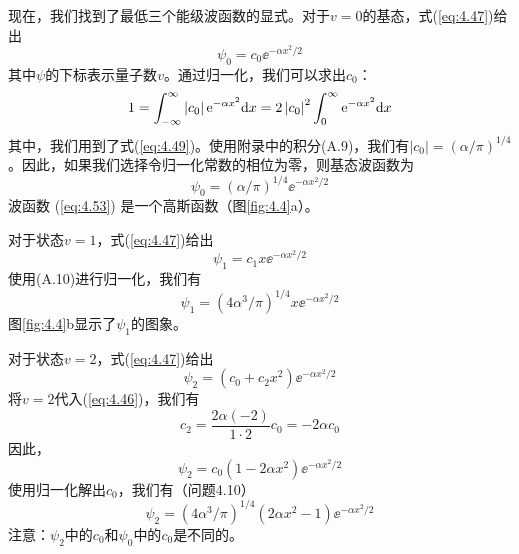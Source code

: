     现在，我们找到了最低三个能级波函数的显式。对于$v=0$的基态，式(\ref{eq:4.47})给出
    \begin{equation}
        \psi_0 = c_0\ee ^{-\alpha x^2/2}
        \label{eq:4.52}
    \end{equation}
    其中$\psi$的下标表示量子数$v$。通过归一化，我们可以求出$c_0$：
    \begin{equation*}
        1 = \int_{-\infty}^{\infty} \left|c_0\right|\mathrm{e} ^{-\alpha x^2}\dd x = 2\left|c_0\right|^2\int_{0}^{\infty}\mathrm{e} ^{-\alpha x^2}\dd x
    \end{equation*}
    其中，我们用到了式(\ref{eq:4.49})。使用附录中的积分(A.9)，我们有$\left|c_0\right| = \left(\alpha/\pi\right)^{1/4}$。因此，如果我们选择令归一化常数的相位为零，则基态波函数为
    \begin{equation}
        \psi_0 = \left(\alpha / \pi\right)^{1/4}\ee ^{-\alpha x^2 /2}
        \label{eq:4.53}
    \end{equation}
    波函数 (\ref{eq:4.53}) 是一个高斯函数（图\ref{fig:4.4}a）。

    对于状态$v=1$，式(\ref{eq:4.47})给出
    \begin{equation}
        \psi_1 = c_1x\ee ^{-\alpha x^2 / 2}
        \label{eq:4.54}
    \end{equation}
    使用(A.10)进行归一化，我们有
    \begin{equation}
        \psi_1 = \left(4\alpha^3 / \pi\right)^{1/4}x\ee ^{-\alpha x^2 / 2}
        \label{eq:4.55}
    \end{equation}
    图\ref{fig:4.4}b显示了$\psi_1$的图象。

    对于状态$v=2$，式(\ref{eq:4.47})给出
    \begin{equation*}
        \psi_2 = \left(c_0 + c_2x^2\right)\ee ^{-\alpha x^2 / 2}
    \end{equation*}
    将$v=2$代入(\ref{eq:4.46})，我们有
    \begin{equation*}
        c_2 = \frac{2\alpha \left(-2\right)}{1\cdot2}c_0 = -2\alpha c_0
    \end{equation*}
    因此，
    \begin{equation}
        \psi_2 = c_0\left(1-2\alpha x^2\right)\ee ^{-\alpha x^2 / 2}
        \label{eq:4.56}
    \end{equation}
    使用归一化解出$c_0$，我们有（问题4.10）
    \begin{equation}
        \psi_2 = \left(4\alpha^3 / \pi\right)^{1/4}\left(2\alpha x^2 - 1\right)\ee ^{-\alpha x^2 / 2}
        \label{eq:4.57}
    \end{equation}
    注意：$\psi_2$中的$c_0$和$\psi_0$中的$c_0$是不同的。

